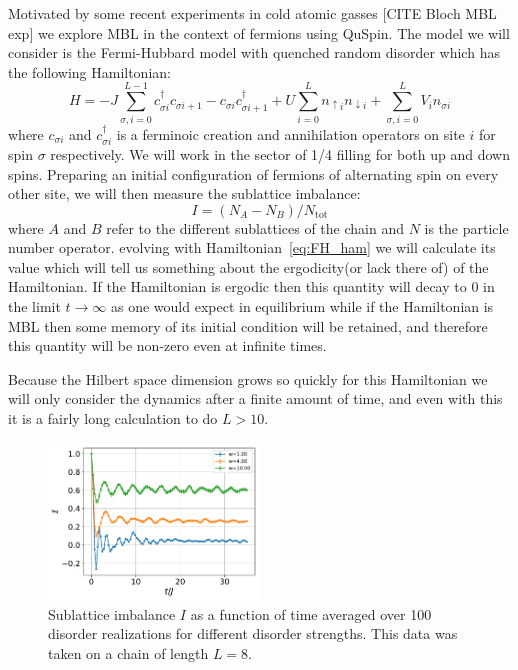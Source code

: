 \documentclass{SciPost}
\newcommand\0{\scalebox{-1}[1]{0}}
\begin{document}
Motivated by some recent experiments in cold atomic gasses [CITE Bloch MBL exp] we explore MBL in the context of fermions using QuSpin. The model we will consider is the Fermi-Hubbard model with quenched random disorder which has the following Hamiltonian:
\begin{equation}
	H = -J\sum_{\sigma,i=0}^{L-1} c^\dagger_{\sigma i}c_{\sigma i+1} - c_{\sigma i}c^\dagger_{\sigma i+1} +U\sum_{i=0}^L n_{\uparrow i}n_{\downarrow i} + \sum_{\sigma, i=0}^L V_i n_{\sigma i}\label{eq:FH_ham}
\end{equation}
where $c_{\sigma i}$ and $c^\dagger_{\sigma i}$ is a ferminoic creation and annihilation operators on site $i$ for spin $\sigma$ respectively. We will work in the sector of 1/4 filling for both up and down spins. Preparing an initial configuration of fermions of alternating spin on every other site, we will then measure the sublattice imbalance:
\begin{equation}
	I = (N_A-N_B)/N_\mathrm{tot}
\end{equation}
where $A$ and $B$ refer to the different sublattices of the chain and $N$ is the particle number operator. evolving with Hamiltonian~\eqref{eq:FH_ham} we will calculate its value which will tell us something about the ergodicity(or lack there of) of the Hamiltonian. If the Hamiltonian is ergodic then this quantity will decay to $0$ in the limit $t\rightarrow\infty$ as one would expect in equilibrium while if the Hamiltonian is MBL then some memory of its initial condition will be retained, and therefore this quantity will be non-zero even at infinite times.

Because the Hilbert space dimension grows so quickly for this Hamiltonian we will only consider the dynamics after a finite amount of time, and even with this it is a fairly long calculation to do $L>10$. 

\begin{figure}[t!]
	\centering
	\includegraphics[width=0.5\textwidth]{fermion_MBL.pdf}
	\caption{Sublattice imbalance $I$ as a function of time averaged over 100 disorder realizations for different disorder strengths. This data was taken on a chain of length $L=8$.}
\end{figure}
\end{document}

